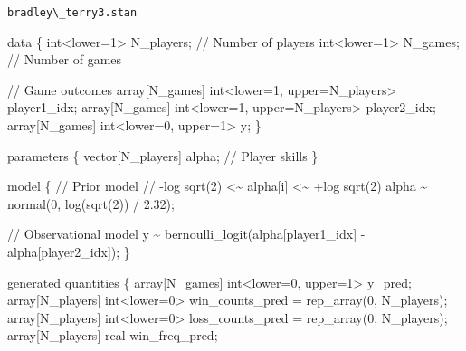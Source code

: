 \documentclass[
  letterpaper,
  DIV=11,
  numbers=noendperiod]{scrartcl}
\newenvironment{Shaded}{\begin{snugshade}}{\end{snugshade}}
\newcommand{\CommentTok}[1]{\textcolor[rgb]{0.37,0.37,0.37}{#1}}
\newcommand{\DataTypeTok}[1]{\textcolor[rgb]{0.68,0.00,0.00}{#1}}
\newcommand{\DecValTok}[1]{\textcolor[rgb]{0.68,0.00,0.00}{#1}}
\newcommand{\FloatTok}[1]{\textcolor[rgb]{0.68,0.00,0.00}{#1}}
\newcommand{\KeywordTok}[1]{\textcolor[rgb]{0.00,0.23,0.31}{#1}}
\newcommand{\NormalTok}[1]{\textcolor[rgb]{0.00,0.23,0.31}{#1}}
\begin{document}
\begin{codelisting}

\caption{\texttt{bradley\textbackslash\_terry3.stan}}

\begin{Shaded}
\begin{Highlighting}[]
\KeywordTok{data}\NormalTok{ \{}
  \DataTypeTok{int}\NormalTok{\textless{}}\KeywordTok{lower}\NormalTok{=}\DecValTok{1}\NormalTok{\textgreater{} N\_players; }\CommentTok{// Number of players}
  \DataTypeTok{int}\NormalTok{\textless{}}\KeywordTok{lower}\NormalTok{=}\DecValTok{1}\NormalTok{\textgreater{} N\_games;   }\CommentTok{// Number of games}

  \CommentTok{// Game outcomes}
  \DataTypeTok{array}\NormalTok{[N\_games] }\DataTypeTok{int}\NormalTok{\textless{}}\KeywordTok{lower}\NormalTok{=}\DecValTok{1}\NormalTok{, }\KeywordTok{upper}\NormalTok{=N\_players\textgreater{} player1\_idx;}
  \DataTypeTok{array}\NormalTok{[N\_games] }\DataTypeTok{int}\NormalTok{\textless{}}\KeywordTok{lower}\NormalTok{=}\DecValTok{1}\NormalTok{, }\KeywordTok{upper}\NormalTok{=N\_players\textgreater{} player2\_idx;}
  \DataTypeTok{array}\NormalTok{[N\_games] }\DataTypeTok{int}\NormalTok{\textless{}}\KeywordTok{lower}\NormalTok{=}\DecValTok{0}\NormalTok{, }\KeywordTok{upper}\NormalTok{=}\DecValTok{1}\NormalTok{\textgreater{} y;}
\NormalTok{\}}

\KeywordTok{parameters}\NormalTok{ \{}
  \DataTypeTok{vector}\NormalTok{[N\_players] alpha; }\CommentTok{// Player skills}
\NormalTok{\}}

\KeywordTok{model}\NormalTok{ \{}
  \CommentTok{// Prior model}
  \CommentTok{// {-}log sqrt(2) \textless{}\textasciitilde{} alpha[i] \textless{}\textasciitilde{} +log sqrt(2)}
\NormalTok{  alpha \textasciitilde{} normal(}\DecValTok{0}\NormalTok{, log(sqrt(}\DecValTok{2}\NormalTok{)) / }\FloatTok{2.32}\NormalTok{);}

  \CommentTok{// Observational model}
\NormalTok{  y \textasciitilde{} bernoulli\_logit(alpha[player1\_idx] {-} alpha[player2\_idx]);}
\NormalTok{\}}

\KeywordTok{generated quantities}\NormalTok{ \{}
  \DataTypeTok{array}\NormalTok{[N\_games] }\DataTypeTok{int}\NormalTok{\textless{}}\KeywordTok{lower}\NormalTok{=}\DecValTok{0}\NormalTok{, }\KeywordTok{upper}\NormalTok{=}\DecValTok{1}\NormalTok{\textgreater{} y\_pred;}
  \DataTypeTok{array}\NormalTok{[N\_players] }\DataTypeTok{int}\NormalTok{\textless{}}\KeywordTok{lower}\NormalTok{=}\DecValTok{0}\NormalTok{\textgreater{} win\_counts\_pred}
\NormalTok{    = rep\_array(}\DecValTok{0}\NormalTok{, N\_players);}
  \DataTypeTok{array}\NormalTok{[N\_players] }\DataTypeTok{int}\NormalTok{\textless{}}\KeywordTok{lower}\NormalTok{=}\DecValTok{0}\NormalTok{\textgreater{} loss\_counts\_pred}
\NormalTok{    = rep\_array(}\DecValTok{0}\NormalTok{, N\_players);}
  \DataTypeTok{array}\NormalTok{[N\_players] }\DataTypeTok{real}\NormalTok{ win\_freq\_pred;}


\end{Highlighting}
\end{Shaded}
\end{codelisting}
\end{document}
